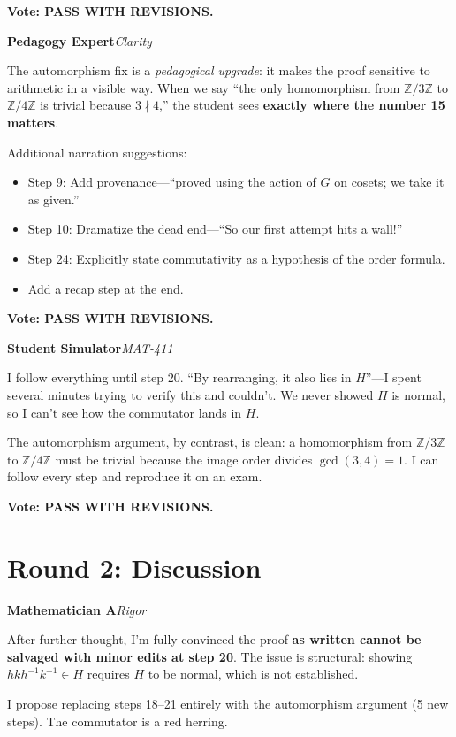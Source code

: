 \documentclass[11pt]{article}
\newcommand{\agent}[3]{%
  \medskip\noindent
  \textcolor{#1}{\textbf{#2}}\hfill\textcolor{#1}{\textit{#3}}\par\smallskip
}
\begin{document}
\textbf{Vote: PASS WITH REVISIONS.}

\bigskip
\agent{pedorange}{Pedagogy Expert}{Clarity}

The automorphism fix is a \emph{pedagogical upgrade}: it makes the proof sensitive to arithmetic in a visible way. When we say ``the only homomorphism from $\mathbb{Z}/3\mathbb{Z}$ to $\mathbb{Z}/4\mathbb{Z}$ is trivial because $3 \nmid 4$,'' the student sees \textbf{exactly where the number 15 matters}.

Additional narration suggestions:
\begin{itemize}[nosep]
  \item Step 9: Add provenance---``proved using the action of $G$ on cosets; we take it as given.''
  \item Step 10: Dramatize the dead end---``So our first attempt hits a wall!''
  \item Step 24: Explicitly state commutativity as a hypothesis of the order formula.
  \item Add a recap step at the end.
\end{itemize}

\textbf{Vote: PASS WITH REVISIONS.}

\bigskip
\agent{studentpurple}{Student Simulator}{MAT-411}

I follow everything until step 20. ``By rearranging, it also lies in $H$''---I spent several minutes trying to verify this and couldn't. We never showed $H$ is normal, so I can't see how the commutator lands in $H$.

The automorphism argument, by contrast, is clean: a homomorphism from $\mathbb{Z}/3\mathbb{Z}$ to $\mathbb{Z}/4\mathbb{Z}$ must be trivial because the image order divides $\gcd(3,4)=1$. I can follow every step and reproduce it on an exam.

\textbf{Vote: PASS WITH REVISIONS.}

\section{Round 2: Discussion}

\agent{rigorblue}{Mathematician A}{Rigor}

After further thought, I'm fully convinced the proof \textbf{as written cannot be salvaged with minor edits at step 20}. The issue is structural: showing $hkh^{-1}k^{-1} \in H$ requires $H$ to be normal, which is not established.

I propose replacing steps 18--21 entirely with the automorphism argument (5 new steps). The commutator is a red herring.
\end{document}
